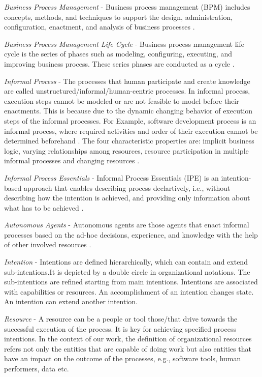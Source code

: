 \textit{Business Process Management} - Business process management (BPM) includes concepts, methods, and techniques to support the design, administration, configuration, enactment, and analysis of business processes \cite{Weske2012}.

\textit{Business Process Management Life Cycle} - Business process management life cycle is the series of phases such as modeling, configuring, executing, and improving business process. These series phases are conducted as a cycle \cite{Weske2012}.

\textit{Informal Process} - The processes that human participate and create knowledge are called unstructured/informal/human-centric processes. In informal process, execution steps cannot be modeled or are not feasible to model before their enactments. This is because due to the dynamic changing behavior of execution steps of the informal processes.  For Example, software development process is an informal process, where required activities and order of their execution cannot be determined beforehand \cite{Sungur2015}. The four characteristic properties are: implicit business logic, varying relationships among resources, resource participation in multiple informal processes and changing resources \cite{Sungur2014a}.    

\textit{Informal Process Essentials} - Informal Process Essentials (IPE) is an intention-based approach that enables describing process declartively, i.e., without describing how the intention is achieved, and providing only information about what has to be achieved \cite{Sungur2014a}. 

\textit{Autonomous Agents} - Autonomous agents are those agents that enact informal processes based on the ad-hoc decisions, experience, and knowledge with the help of other involved resources   \cite{Sungur2015}. 

\textit{Intention} - Intentions are defined hierarchically, which can contain and extend sub-intentions.It is depicted by a double circle in organizational notations. The sub-intentions are refined starting from main intentions. Intentions are associated with capabilities or resources. An accomplishment of an intention changes state. An intention can extend another intention.        

\textit{Resource} - A resource can be a people or tool those/that drive towards the successful execution of the process. It is key for achieving specified process intentions. In the context of our work, the definition of organizational resources refers not only the entities that are capable of doing work but also entities that have an impact on the outcome of the processes, e.g., software tools, human performers, data etc.      

